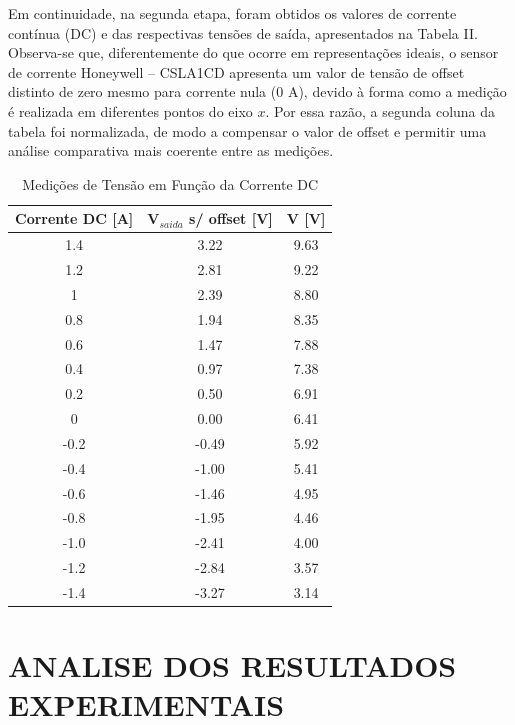 \documentclass[10pt,twocolumn,letterpaper]{article}
\begin{document}
\hspace{1cm} Em continuidade, na segunda etapa, foram obtidos os valores de corrente contínua (DC) e das respectivas tensões de saída, apresentados na Tabela II. Observa-se que, diferentemente do que ocorre em representações ideais, o sensor de corrente Honeywell – CSLA1CD apresenta um valor de tensão de offset distinto de zero mesmo para corrente nula (0 A), devido à forma como a medição é realizada em diferentes pontos do eixo $x$. Por essa razão, a segunda coluna da tabela foi normalizada, de modo a compensar o valor de offset e permitir uma análise comparativa mais coerente entre as medições.

\begin{table}[htbp]
    \centering
    \caption{Medições de Tensão em Função da Corrente DC}
    \label{tab:medicoes_tensao}
    \vspace{0.25cm}
    \begin{tabular}{ccc}
        \hline
        \rule{0pt}{3ex}\textbf{Corrente DC [A]} & \textbf{V}$_{saida}$ \textbf{s/ offset [V]} & \textbf{V [V]} \\ [5pt]
        \hline
        \rule{0pt}{3ex}1.4   & 3.22 &  9.63 \\
        1.2   & 2.81 &  9.22 \\
        1     & 2.39 &  8.80 \\
        0.8   & 1.94 &  8.35 \\
        0.6   & 1.47 &  7.88 \\
        0.4   & 0.97 &  7.38 \\
        0.2   & 0.50 &  6.91 \\
        0     & 0.00 &  6.41 \\
        -0.2  & -0.49 &  5.92 \\
        -0.4  & -1.00 &  5.41 \\
        -0.6  & -1.46 &  4.95 \\
        -0.8  & -1.95 &  4.46 \\
        -1.0  & -2.41 &  4.00 \\
        -1.2  & -2.84 &  3.57 \\
        -1.4  & -3.27 &  3.14 \\ [5pt]
        \hline
    \end{tabular}
\end{table}


\section{ANALISE DOS RESULTADOS EXPERIMENTAIS}
\end{document}
